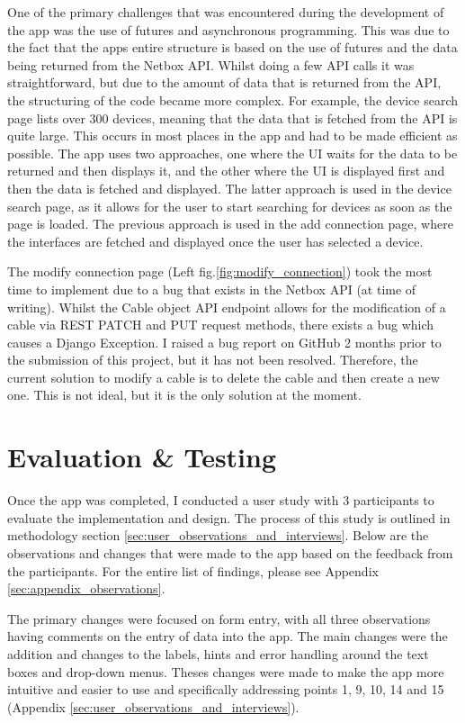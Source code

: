 \documentclass [11pt,a4paper]{article}
\begin{document}
One of the primary challenges that was encountered during the development of the app was the use of futures and asynchronous programming. This was due to the fact that the apps entire structure is based on the use of futures and the data being returned from the Netbox API. Whilst doing a few API calls it was straightforward, but due to the amount of data that is returned from the API, the structuring of the code became more complex. For example, the device search page lists over 300 devices, meaning that the data that is fetched from the API is quite large. This occurs in most places in the app and had to be made efficient as possible. The app uses two approaches, one where the UI waits for the data to be returned and then displays it, and the other where the UI is displayed first and then the data is fetched and displayed. The latter approach is used in the device search page, as it allows for the user to start searching for devices as soon as the page is loaded. The previous approach is used in the add connection page, where the interfaces are fetched and displayed once the user has selected a device. 

The modify connection page (Left fig.\ref{fig:modify_connection}) took the most time to implement due to a bug that exists in the Netbox API (at time of writing). Whilst the Cable object API endpoint allows for the modification of a cable via REST PATCH and PUT request methods, there exists a bug which causes a Django Exception. I raised a bug report on GitHub \cite{netboxBug} 2 months prior to the submission of this project, but it has not been resolved. Therefore, the current solution to modify a cable is to delete the cable and then create a new one. This is not ideal, but it is the only solution at the moment. 


\section{Evaluation \& Testing}
\label{sec:evaluation}
Once the app was completed, I conducted a user study with 3 participants to evaluate the implementation and design. The process of this study is outlined in methodology section \ref{sec:user_observations_and_interviews}. Below are the observations and changes that were made to the app based on the feedback from the participants. For the entire list of findings, please see Appendix \ref{sec:appendix_observations}. 

The primary changes were focused on form entry, with all three observations having comments on the entry of data into the app. The main changes were the addition and changes to the labels, hints and error handling around the text boxes and drop-down menus. Theses changes were made to make the app more intuitive and easier to use and specifically addressing points 1, 9, 10, 14 and 15 (Appendix \ref{sec:user_observations_and_interviews}). 
\end{document}
